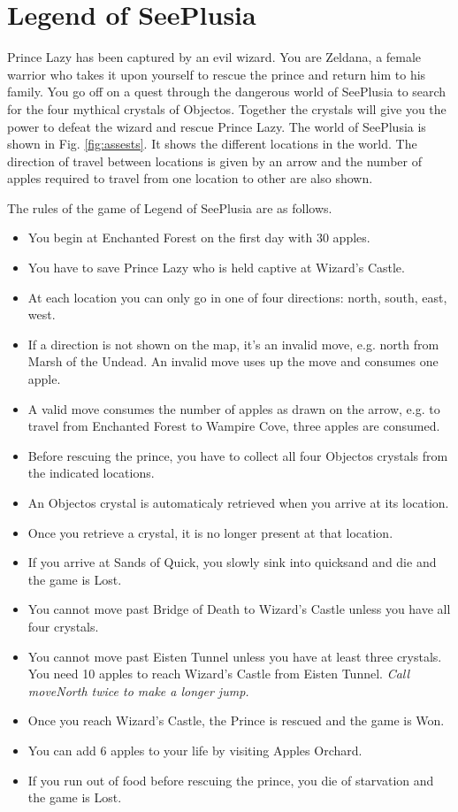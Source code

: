 \documentclass[a4paper,12pt]{article}
\begin{document}
\newpage

\section{Legend of SeePlusia}

Prince Lazy has been captured by an evil wizard. You are Zeldana, a female warrior who takes it upon
yourself to rescue the prince and return him to his family. You go off on a quest through the dangerous
world of SeePlusia to search for the four mythical crystals of Objectos. Together the crystals will give
you the power to defeat the wizard and rescue Prince Lazy.
The world of SeePlusia is shown in Fig. \ref{fig:assests}. It shows the different locations in the world. The direction of travel between locations is given by an arrow and the number of apples required to travel from one location to other are also shown.

The rules of the game of Legend of SeePlusia are as follows.
\begin{itemize}
	\item You begin at Enchanted Forest on the first day with 30 apples.
	\item You have to save Prince Lazy who is held captive at Wizard's Castle.
	\item At each location you can only go in one of four directions: north, south, east, west.
	\item If a direction is not shown on the map, it's an invalid move, e.g. north from
	      Marsh of the Undead. An invalid move uses up the move and consumes one apple.
	\item A valid move consumes the number of apples as drawn on the arrow, e.g. to travel from Enchanted Forest to Wampire Cove, three apples are consumed.
	\item Before rescuing the prince, you have to collect all four Objectos crystals from the indicated locations.
	\item An Objectos crystal is automaticaly retrieved when you arrive at its location.
	\item Once you retrieve a crystal, it is no longer present at that location.
	\item If you arrive at Sands of Quick, you slowly sink into quicksand and die and the game is Lost.
	\item You cannot move past Bridge of Death to Wizard's Castle unless you have all four crystals.
	\item You cannot move past Eisten Tunnel unless you have at least three crystals. You need 10 apples to reach Wizard's Castle from Eisten Tunnel. \textit{Call moveNorth twice to make a longer jump.}
	\item Once you reach Wizard’s Castle, the Prince is rescued and the game is Won.
	\item You can add 6 apples to your life by visiting Apples Orchard.
	\item If you run out of food before rescuing the prince, you die of starvation and the game is Lost.
\end{itemize}
\end{document}
